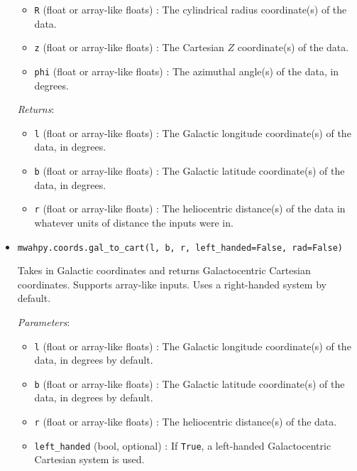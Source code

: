 \documentclass{article}
\begin{document}
\begin{itemize}
\begin{itemize}
\item \verb!R! (float or array-like floats) : The cylindrical radius coordinate(s) of the data.

\item \verb!z! (float or array-like floats) : The Cartesian $Z$ coordinate(s) of the data.

\item \verb!phi! (float or array-like floats) : The azimuthal angle(s) of the data, in degrees.

\end{itemize}

\textit{Returns}: \begin{itemize}

\item \verb!l! (float or array-like floats) : The Galactic longitude coordinate(s) of the data, in degrees.

\item \verb!b! (float or array-like floats) : The Galactic latitude coordinate(s) of the data, in degrees.

\item \verb!r! (float or array-like floats) : The heliocentric distance(s) of the data in whatever units of distance the inputs were in.

\end{itemize}



\item \verb!mwahpy.coords.gal_to_cart(l, b, r, left_handed=False, rad=False)!

Takes in Galactic coordinates and returns Galactocentric Cartesian coordinates. Supports array-like inputs. Uses a right-handed system by default.

\textit{Parameters}: \begin{itemize}

\item \verb!l! (float or array-like floats) : The Galactic longitude coordinate(s) of the data, in degrees by default.

\item \verb!b! (float or array-like floats) : The Galactic latitude coordinate(s) of the data, in degrees by default.

\item \verb!r! (float or array-like floats) : The heliocentric distance(s) of the data.

\item \verb!left_handed! (bool, optional) : If \verb!True!, a left-handed Galactocentric Cartesian system is used.


\end{itemize}
\end{itemize}
\end{document}
